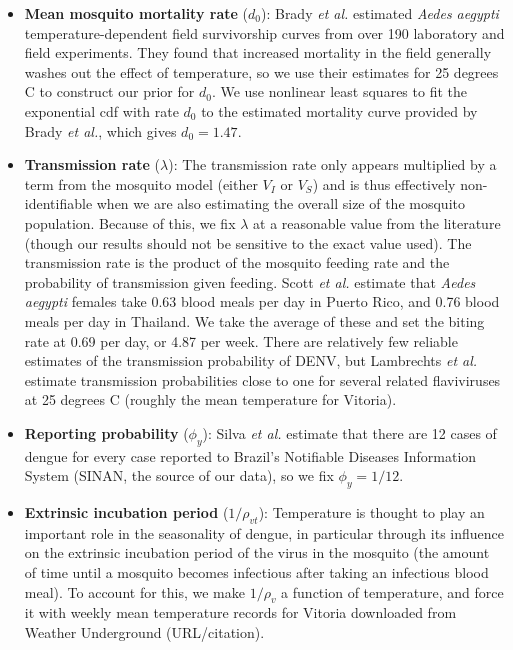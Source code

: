 \documentclass[12pt,letterpaper]{article}
\begin{document}
\begin{itemize}
\item \textbf{Mean mosquito mortality rate} ($d_0$): Brady \textit{et al.} \cite{Brady2013} estimated \textit{Aedes aegypti} temperature-dependent field survivorship curves from over 190 laboratory and field experiments.
They found that increased mortality in the field generally washes out the effect of temperature, so we use their estimates for 25 degrees C to construct our prior for $d_0$.  
We use nonlinear least squares to fit the exponential cdf with rate $d_0$ to the estimated mortality curve provided by Brady \textit{et al.}, which gives $d_0 = 1.47$.
\\
\item \textbf{Transmission rate} ($\lambda$): The transmission rate only appears multiplied by a term from the mosquito model (either $V_I$ or $V_S$) and is thus effectively non-identifiable when we are also estimating the overall size of the mosquito population.
Because of this, we fix $\lambda$ at a reasonable value from the literature (though our results should not be sensitive to the exact value used).
The transmission rate is the product of the mosquito feeding rate and the probability of transmission given feeding.
Scott \textit{et al.} \cite{Scott2000} estimate that \textit{Aedes aegypti} females take 0.63 blood meals per day in Puerto Rico, and 0.76 blood meals per day in Thailand.
We take the average of these and set the biting rate at 0.69 per day, or 4.87 per week.
There are relatively few reliable estimates of the transmission probability of DENV, but Lambrechts \textit{et al.} \cite{Lambrechts2011} estimate transmission probabilities close to one  for several related flaviviruses at 25 degrees C (roughly the mean temperature for Vitoria).
\\
\item \textbf{Reporting probability} ($\phi_y$): Silva \textit{et al.} \cite{Silva2016} estimate that there are 12 cases of dengue for every case reported to Brazil's Notifiable Diseases Information System (SINAN, the source of our data), so we fix $\phi_y = 1/12$.
\\
\item \textbf{Extrinsic incubation period} ($1/\rho_{vt}$): Temperature is thought to play an important role in the seasonality of dengue, in particular through its influence on the extrinsic incubation period of the virus in the mosquito  (the amount of time until a mosquito becomes infectious after taking an infectious blood meal).
To account for this, we make $1/\rho_v$ a function of temperature, and force it with weekly mean temperature records for Vitoria downloaded from Weather Underground (URL/citation).

\end{itemize}
\end{document}
